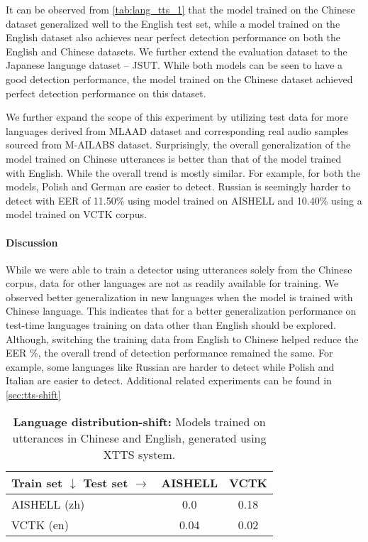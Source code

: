 It can be observed from \autoref{tab:lang_tts_1} that the model trained on the Chinese dataset generalized well to the English test set, while a model trained on the English dataset also achieves near perfect detection performance on both the English and Chinese datasets. We further extend the evaluation dataset to the Japanese language dataset -- JSUT. While both models can be seen to have a good detection performance, the model trained on the Chinese dataset achieved perfect detection performance on this dataset. 

We further expand the scope of this experiment by utilizing test data for more languages derived from MLAAD \cite{muller2024mlaad} dataset and corresponding real audio samples sourced from M-AILABS \cite{mai} dataset. Surprisingly, the overall generalization of the model trained on Chinese utterances is better than that of the model trained with English. While the overall trend is mostly similar. For example, for both the models, Polish and German are easier to detect. Russian is seemingly harder to detect with EER of 11.50\% using model trained on AISHELL and 10.40\% using a model trained on VCTK corpus. 
\paragraph{Discussion} While we were able to train a detector using utterances solely from the Chinese corpus, data for other languages are not as readily available for training. We observed better generalization in new languages when the model is trained with Chinese language. This indicates that for a better generalization performance on test-time languages training on data other than English should be explored. 
Although, switching the training data from English to Chinese helped reduce the EER \%, the overall trend of detection performance remained the same. For example, some languages like Russian are harder to detect while Polish and Italian are easier to detect. Additional related experiments can be found in \autoref{sec:tts-shift}

\begin{table*}[H]
    \centering
    \scriptsize
    \caption{\textbf{Language distribution-shift:} Models trained on utterances in Chinese and English, generated using XTTS system.}
    \label{tab:lang_tts}
    \begin{tabular}{lcc}
      \toprule
    Train set $\downarrow$ Test set $\rightarrow$ & AISHELL & VCTK \\
  \hline 
  AISHELL (zh) & 0.0 & 0.18\\ 
  \hline
  VCTK (en) & 0.04 & 0.02\\ 
 \bottomrule 
    \end{tabular}
\end{table*}


